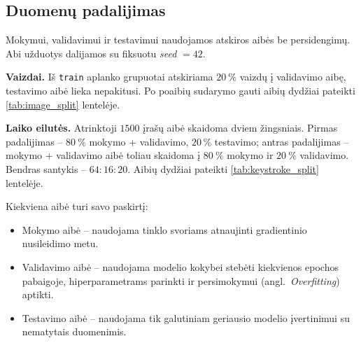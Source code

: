 \subsection{Duomenų padalijimas}
\label{subsec:cnn_duomenu_padalijimas}

Mokymui, validavimui ir testavimui naudojamos atskiros aibės be persidengimų. Abi užduotys dalijamos su fiksuotu \textit{seed} $= 42$.

\textbf{Vaizdai.} Iš \texttt{train} aplanko grupuotai atskiriama $20\ \%$ vaizdų į validavimo aibę, testavimo aibė lieka nepakitusi. Po poaibių sudarymo gauti aibių dydžiai pateikti \ref{tab:image_split} lentelėje.



\textbf{Laiko eilutės.} Atrinktoji $1500$ įrašų aibė skaidoma dviem žingsniais. Pirmas padalijimas – $80\ \%$ mokymo + validavimo, $20\,\%$ testavimo; antras padalijimas – mokymo + validavimo aibė toliau skaidoma į $80\ \%$ mokymo ir $20\ \%$ validavimo. Bendras santykis – $64{:}16{:}20$. Aibių dydžiai pateikti \ref{tab:keystroke_split} lentelėje.



Kiekviena aibė turi savo paskirtį:
\begin{itemize}
    \item Mokymo aibė – naudojama tinklo svoriams atnaujinti gradientinio nusileidimo metu.
    \item Validavimo aibė – naudojama modelio kokybei stebėti kiekvienos epochos pabaigoje, hiperparametrams parinkti ir persimokymui (angl.~\textit{Overfitting}) aptikti.
    \item Testavimo aibė – naudojama tik galutiniam geriausio modelio įvertinimui su nematytais duomenimis.
\end{itemize}
